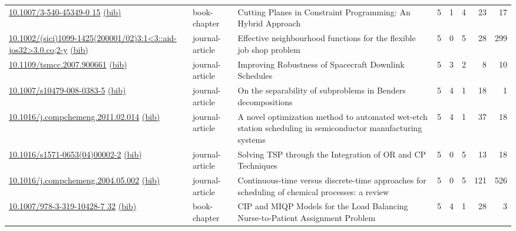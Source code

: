 {\begin{longtable}{p{5cm}lp{11cm}rrrrr}
\href{http://dx.doi.org/10.1007/3-540-45349-0_15}{10.1007/3-540-45349-0 15} \href{https://www.doi2bib.org/bib/10.1007/3-540-45349-0_15}{(bib)} & book-chapter & Cutting Planes in Constraint Programming: An Hybrid Approach & 5 & 1 & 4 & 23 & 17 \\
\href{http://dx.doi.org/10.1002/(sici)1099-1425(200001/02)3:1<3::aid-jos32>3.0.co;2-y}{10.1002/(sici)1099-1425(200001/02)3:1<3::aid-jos32>3.0.co;2-y} \href{https://www.doi2bib.org/bib/10.1002/(sici)1099-1425(200001/02)3:1<3::aid-jos32>3.0.co;2-y}{(bib)} & journal-article & Effective neighbourhood functions for the flexible job shop problem & 5 & 0 & 5 & 28 & 299 \\
\href{http://dx.doi.org/10.1109/tsmcc.2007.900661}{10.1109/tsmcc.2007.900661} \href{https://www.doi2bib.org/bib/10.1109/tsmcc.2007.900661}{(bib)} & journal-article & Improving Robustness of Spacecraft Downlink Schedules & 5 & 3 & 2 & 8 & 10 \\
\href{http://dx.doi.org/10.1007/s10479-008-0383-5}{10.1007/s10479-008-0383-5} \href{https://www.doi2bib.org/bib/10.1007/s10479-008-0383-5}{(bib)} & journal-article & On the separability of subproblems in Benders decompositions & 5 & 4 & 1 & 18 & 1 \\
\href{http://dx.doi.org/10.1016/j.compchemeng.2011.02.014}{10.1016/j.compchemeng.2011.02.014} \href{https://www.doi2bib.org/bib/10.1016/j.compchemeng.2011.02.014}{(bib)} & journal-article & A novel optimization method to automated wet-etch station scheduling in semiconductor manufacturing systems & 5 & 4 & 1 & 37 & 18 \\
\href{http://dx.doi.org/10.1016/s1571-0653(04)00002-2}{10.1016/s1571-0653(04)00002-2} \href{https://www.doi2bib.org/bib/10.1016/s1571-0653(04)00002-2}{(bib)} & journal-article & Solving TSP through the Integration of OR and CP Techniques & 5 & 0 & 5 & 13 & 18 \\
\href{http://dx.doi.org/10.1016/j.compchemeng.2004.05.002}{10.1016/j.compchemeng.2004.05.002} \href{https://www.doi2bib.org/bib/10.1016/j.compchemeng.2004.05.002}{(bib)} & journal-article & Continuous-time versus discrete-time approaches for scheduling of chemical processes: a review & 5 & 0 & 5 & 121 & 526 \\
\href{http://dx.doi.org/10.1007/978-3-319-10428-7_32}{10.1007/978-3-319-10428-7 32} \href{https://www.doi2bib.org/bib/10.1007/978-3-319-10428-7_32}{(bib)} & book-chapter & CIP and MIQP Models for the Load Balancing Nurse-to-Patient Assignment Problem & 5 & 4 & 1 & 28 & 3 \\

\end{longtable}}

